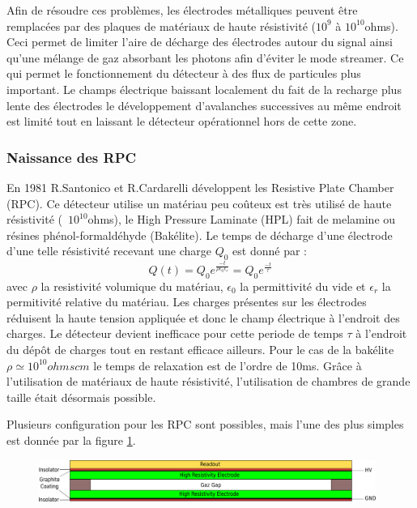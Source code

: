 Afin de résoudre ces problèmes, les électrodes métalliques peuvent être remplacées par des plaques de matériaux de haute résistivité ($10^{9}$ à $10^{10}$ohms). Ceci permet de limiter l'aire de décharge des électrodes autour du signal ainsi qu'une mélange de gaz absorbant les photons afin d'éviter le mode streamer. Ce qui permet le fonctionnement du détecteur à des flux de particules plus important. Le champs électrique baissant localement du fait de la recharge plus lente des électrodes le développement d'avalanches successives au même endroit est limité tout en laissant le détecteur opérationnel hors de cette zone.

\subsubsection{Naissance des RPC}
En 1981 R.Santonico et R.Cardarelli développent les Resistive Plate Chamber (RPC). Ce détecteur utilise un matériau peu coûteux est très utilisé de haute résistivité (~$10^{10}$ohms), le High Pressure Laminate (HPL) fait de melamine ou résines phénol-formaldéhyde (Bakélite). Le temps de décharge d'une électrode d'une telle résistivité recevant une charge $Q_{0}$ est donné par :
\begin{equation}
Q(t)=Q_{0}e^{\frac{-t}{\rho\epsilon_{0}\epsilon_{r}}}=Q_{0}e^{\frac{-t}{\tau}}
\end{equation}
avec $\rho$ la resistivité volumique du matériau, $\epsilon_{0}$ la permittivité du vide et $\epsilon_{r}$ la permitivité relative du matériau.
Les charges présentes sur les électrodes réduisent la haute tension appliquée et donc le champ électrique à l'endroit des charges. Le détecteur devient inefficace pour cette periode de temps $\tau$ à l'endroit du dépôt de charges tout en restant efficace ailleurs. Pour le cas de la bakélite $\rho\simeq10^{10}ohmscm$ le temps de relaxation est de l'ordre de 10ms. Grâce à l'utilisation de matériaux de haute résistivité, l'utilisation de chambres de grande taille était désormais possible.

Plusieurs configuration pour les RPC sont possibles, mais l'une des plus simples est donnée par la figure \ref{RPCscheme}.

\begin{figure}[h!]
	\centering
	\includegraphics[width=0.98\textwidth]{RPC/scheme_first.png}
	\label{RPCscheme}
\end{figure}

